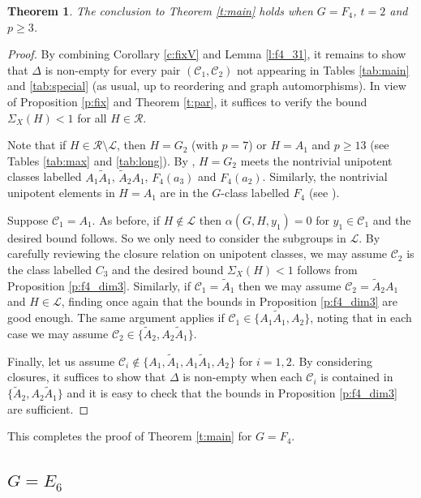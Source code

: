 \documentclass[twoside,a4paper,reqno,11pt]{amsart}
\renewcommand{\a}{\alpha}
\newcommand{\<}{\langle}
\renewcommand{\>}{\rangle}
\newcommand{\geqs}{\geqslant}
\renewcommand{\:}{\colon}
\theoremstyle{plain}
\newtheorem{thm}{Theorem}[section]
\theoremstyle{definition}
\begin{document}
\begin{thm}\label{t:f4_2}
The conclusion to Theorem \ref{t:main} holds when $G = F_4$, $t=2$ and $p \geqs 3$.
\end{thm}

\begin{proof}
By combining Corollary \ref{c:fixV} and Lemma \ref{l:f4_31}, it remains to show that $\Delta$ is non-empty for every pair $(\mathcal{C}_1,\mathcal{C}_2)$ not appearing in Tables \ref{tab:main} and \ref{tab:special} (as usual, up to reordering and graph automorphisms). In view of Proposition \ref{p:fix} and Theorem \ref{t:par}, it suffices to verify the bound $\Sigma_X(H)<1$ for all $H \in \mathcal{R}$.

Note that if $H \in \mathcal{R} \setminus \mathcal{L}$, then $H = G_2$ (with $p=7$) or $H = A_1$ and $p \geqs 13$ (see Tables \ref{tab:max} and \ref{tab:long}). By \cite[Section 5.2]{Law2}, $H = G_2$ meets the nontrivial unipotent classes labelled $A_1\tilde{A}_1$, $\tilde{A}_2A_1$, $F_4(a_3)$ and $F_4(a_2)$. Similarly, the nontrivial unipotent elements in $H = A_1$ are in the $G$-class labelled $F_4$ (see \cite[Table 27]{Law2}).

Suppose $\mathcal{C}_1 = A_1$. As before, if $H \not\in \mathcal{L}$ then $\a(G,H,y_1) = 0$ for $y_1 \in \mathcal{C}_1$ and the desired bound follows. So we only need to consider the subgroups in $\mathcal{L}$. By carefully reviewing the closure relation on unipotent classes, we may assume $\mathcal{C}_2$ is the class labelled $C_3$ and the desired bound $\Sigma_X(H)<1$ follows from Proposition \ref{p:f4_dim3}. Similarly, if $\mathcal{C}_1 = \tilde{A}_1$ then we may assume $\mathcal{C}_2 = \tilde{A}_2A_1$ and $H \in \mathcal{L}$, finding once again that the bounds in Proposition \ref{p:f4_dim3} are good enough. The same argument applies if $\mathcal{C}_1 \in \{ A_1\tilde{A}_1, A_2\}$, noting that in each case we may assume $\mathcal{C}_2 \in \{\tilde{A}_2, A_2\tilde{A}_1\}$. 

Finally, let us assume $\mathcal{C}_i \not\in \{A_1, \tilde{A}_1, A_1\tilde{A}_1, A_2\}$ for $i=1,2$. By considering closures, it suffices to show that $\Delta$ is non-empty when each $\mathcal{C}_i$ is contained in $\{\tilde{A}_2, A_2\tilde{A}_1\}$ and it is easy to check that the bounds in Proposition \ref{p:f4_dim3} are sufficient.
\end{proof}

This completes the proof of Theorem \ref{t:main} for $G = F_4$.

\subsection{$G = E_6$}\label{ss:e6}
\end{document}
